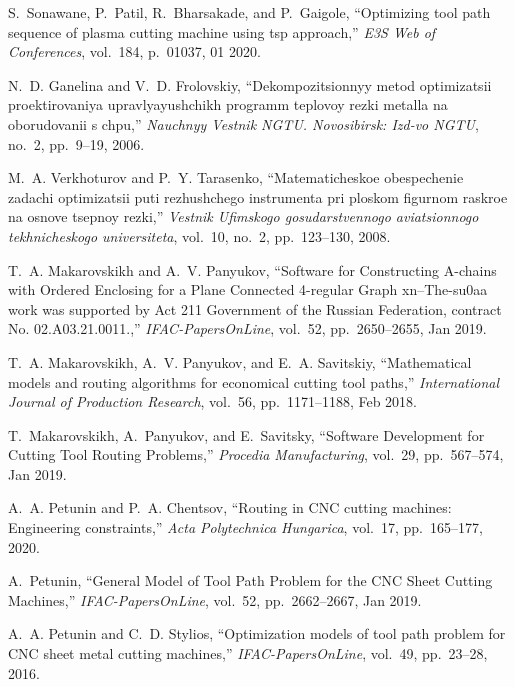   \item
  S.~Sonawane, P.~Patil, R.~Bharsakade, and P.~Gaigole, ``Optimizing tool path
    sequence of plasma cutting machine using tsp approach,'' {\em E3S Web of
    Conferences}, vol.~184, p.~01037, 01 2020.

  \item
  N.~D. Ganelina and V.~D. Frolovskiy, ``Dekompozitsionnyy metod optimizatsii
    proektirovaniya upravlyayushchikh programm teplovoy rezki metalla na
    oborudovanii s chpu,'' {\em Nauchnyy Vestnik NGTU. Novosibirsk: Izd-vo NGTU},
    no.~2, pp.~9--19, 2006.

  \item
  M.~A. Verkhoturov and P.~Y. Tarasenko, ``Matematicheskoe obespechenie zadachi
    optimizatsii puti rezhushchego instrumenta pri ploskom figurnom raskroe na
    osnove tsepnoy rezki,'' {\em Vestnik Ufimskogo gosudarstvennogo aviatsionnogo
    tekhnicheskogo universiteta}, vol.~10, no.~2, pp.~123--130, 2008.

  \item
  T.~A. Makarovskikh and A.~V. Panyukov, ``{Software for Constructing A-chains
    with Ordered Enclosing for a Plane Connected 4-regular Graph xn--The-su0aa
    work was supported by Act 211 Government of the Russian Federation, contract
    No. 02.A03.21.0011.},'' {\em IFAC-PapersOnLine}, vol.~52, pp.~2650--2655, Jan
    2019.

  \item
  T.~A. Makarovskikh, A.~V. Panyukov, and E.~A. Savitskiy, ``{Mathematical models
    and routing algorithms for economical cutting tool paths},'' {\em
    International Journal of Production Research}, vol.~56, pp.~1171--1188, Feb
    2018.

  \item
  T.~Makarovskikh, A.~Panyukov, and E.~Savitsky, ``{Software Development for
    Cutting Tool Routing Problems},'' {\em Procedia Manufacturing}, vol.~29,
    pp.~567--574, Jan 2019.

  \item
  A.~A. Petunin and P.~A. Chentsov, ``Routing in {CNC} cutting machines:
    Engineering constraints,'' {\em Acta Polytechnica Hungarica}, vol.~17,
    pp.~165--177, 2020.

  \item
  A.~Petunin, ``{General Model of Tool Path Problem for the {CNC} Sheet Cutting
    Machines},'' {\em IFAC-PapersOnLine}, vol.~52, pp.~2662--2667, Jan 2019.

  \item
  A.~A. Petunin and C.~D. Stylios, ``Optimization models of tool path problem for
    {CNC} sheet metal cutting machines,'' {\em IFAC-PapersOnLine}, vol.~49,
    pp.~23--28, 2016.

